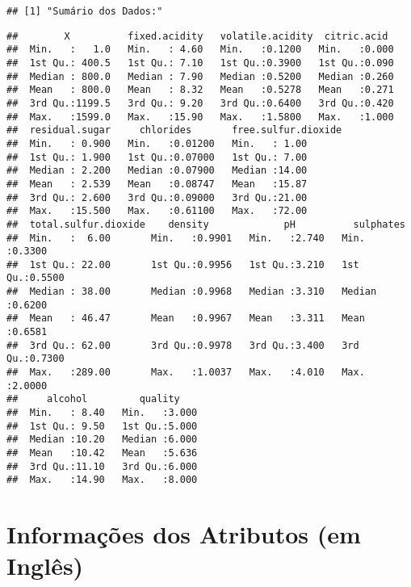 \documentclass[]{article}
\begin{document}
\begin{verbatim}
## [1] "Sumário dos Dados:"
\end{verbatim}

\begin{verbatim}
##        X          fixed.acidity   volatile.acidity  citric.acid   
##  Min.   :   1.0   Min.   : 4.60   Min.   :0.1200   Min.   :0.000  
##  1st Qu.: 400.5   1st Qu.: 7.10   1st Qu.:0.3900   1st Qu.:0.090  
##  Median : 800.0   Median : 7.90   Median :0.5200   Median :0.260  
##  Mean   : 800.0   Mean   : 8.32   Mean   :0.5278   Mean   :0.271  
##  3rd Qu.:1199.5   3rd Qu.: 9.20   3rd Qu.:0.6400   3rd Qu.:0.420  
##  Max.   :1599.0   Max.   :15.90   Max.   :1.5800   Max.   :1.000  
##  residual.sugar     chlorides       free.sulfur.dioxide
##  Min.   : 0.900   Min.   :0.01200   Min.   : 1.00      
##  1st Qu.: 1.900   1st Qu.:0.07000   1st Qu.: 7.00      
##  Median : 2.200   Median :0.07900   Median :14.00      
##  Mean   : 2.539   Mean   :0.08747   Mean   :15.87      
##  3rd Qu.: 2.600   3rd Qu.:0.09000   3rd Qu.:21.00      
##  Max.   :15.500   Max.   :0.61100   Max.   :72.00      
##  total.sulfur.dioxide    density             pH          sulphates     
##  Min.   :  6.00       Min.   :0.9901   Min.   :2.740   Min.   :0.3300  
##  1st Qu.: 22.00       1st Qu.:0.9956   1st Qu.:3.210   1st Qu.:0.5500  
##  Median : 38.00       Median :0.9968   Median :3.310   Median :0.6200  
##  Mean   : 46.47       Mean   :0.9967   Mean   :3.311   Mean   :0.6581  
##  3rd Qu.: 62.00       3rd Qu.:0.9978   3rd Qu.:3.400   3rd Qu.:0.7300  
##  Max.   :289.00       Max.   :1.0037   Max.   :4.010   Max.   :2.0000  
##     alcohol         quality     
##  Min.   : 8.40   Min.   :3.000  
##  1st Qu.: 9.50   1st Qu.:5.000  
##  Median :10.20   Median :6.000  
##  Mean   :10.42   Mean   :5.636  
##  3rd Qu.:11.10   3rd Qu.:6.000  
##  Max.   :14.90   Max.   :8.000
\end{verbatim}

\hypertarget{informacoes-dos-atributos-em-ingles}{%
\section{Informações dos Atributos (em
Inglês)}\label{informacoes-dos-atributos-em-ingles}}
\end{document}
